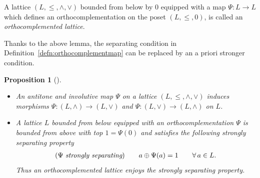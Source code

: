\documentclass[pdftex]{sigma}
\numberwithin{equation}{section}
\newtheorem{Proposition}[Theorem]{Proposition}
\newcommand{\pone}{separating\xspace }
\begin{document}
\begin{Definition} \label{defn:orthocomplemented_lattice}	
A lattice $(L, \leq, \wedge, \vee)$ bounded from below by $0$ equipped with a map $\Psi\colon L\to L$ which defines an orthocomplementation on the poset $(L, \leq , 0)$, is called an {\it orthocomplemented lattice}.
\end{Definition}

Thanks to the above lemma, the separating condition in Definition~\ref{defn:orthocomplementmap} can be replaced by an a priori stronger condition.

\begin{Proposition}[{\cite[Propositions 1.1(iii) and~1.7]{CM}}] \label{prop:Psistronglysep}\qquad
\begin{itemize}\itemsep=0pt
	\item An antitone and involutive map $\Psi$ on a lattice $(L, \leq, \wedge, \vee)$ induces morphisms
 $\Psi\colon (L, \wedge)\to (L, \vee)$ and $\Psi\colon (L, \vee)\to (L, \wedge)$ on $L$.
 \item
A lattice $L$ bounded from below equipped with an orthocomplementation $\Psi$ is bounded from above with top $1=\Psi(0)$ and satisfies the following {\it strongly separating} property 	 \begin{gather}\label{eq:Psistronglyseparating}
(\Psi \text{ \it strongly \pone})\qquad a\oplus \Psi(a) =1 \qquad \forall\, a\in L.
\end{gather}
Thus an orthocomplemented lattice enjoys the strongly separating property.
\end{itemize}
\end{Proposition}
\end{document}
